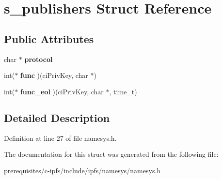 \hypertarget{structs__publishers}{}\section{s\+\_\+publishers Struct Reference}
\label{structs__publishers}
\subsection*{Public Attributes}
\begin{DoxyCompactItemize}
\item 
\mbox{\label{structs__publishers_a7bc9d43e0d6cc8f0a25153f67ef5b3ad}} 
char $\ast$ {\bfseries protocol}
\item 
\mbox{\label{structs__publishers_a2bdbedb693f551b78bdda07cbf4c07d0}} 
int($\ast$ {\bfseries func} )(ci\+Priv\+Key, char $\ast$)
\item 
\mbox{\label{structs__publishers_a782bedcd36fab946d5eda28cce6a70d6}} 
int($\ast$ {\bfseries func\+\_\+eol} )(ci\+Priv\+Key, char $\ast$, time\+\_\+t)
\end{DoxyCompactItemize}


\subsection{Detailed Description}


Definition at line 27 of file namesys.\+h.



The documentation for this struct was generated from the following file\+:\begin{DoxyCompactItemize}
\item 
prerequisites/c-\/ipfs/include/ipfs/namesys/namesys.\+h\end{DoxyCompactItemize}
